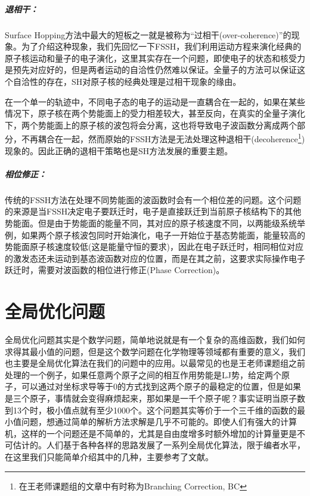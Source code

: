 \documentclass[12pt,a4paper,openany,twoside]{book}
\numberwithin{equation}{section}
\begin{document}
        \paragraph{退相干：}Surface Hopping方法中最大的短板之一就是被称为“过相干(over-coherence)”的现象。为了介绍这种现象，我们先回忆一下FSSH，我们利用运动方程来演化经典的原子核运动和量子的电子演化，这里其实存在一个问题，即使电子的状态和核受力是预先对应好的，但是两者运动的自洽性仍然难以保证。全量子的方法可以保证这个自洽性的存在，SH对原子核的经典处理是过相干现象的缘由。

        在一个单一的轨迹中，不同电子态的电子的运动是一直耦合在一起的，如果在某些情况下，原子核在两个势能面上的受力相差较大，甚至反向，在真实的全量子演化下，两个势能面上的原子核的波包将会分离，这也将导致电子波函数分离成两个部分，不再耦合在一起，然而原始的FSSH方法是无法处理这种退相干(decoherence\footnote{在王老师课题组的文章中有时称为Branching Correction, BC})现象的。因此正确的退相干策略也是SH方法发展的重要主题。
        
        \paragraph{相位修正：}传统的FSSH方法在处理不同势能面的波函数时会有一个相位差的问题。这个问题的来源是当FSSH决定电子要跃迁时，电子是直接跃迁到当前原子核结构下的其他势能面。但是由于势能面的能量不同，其对应的原子核速度不同，以两能级系统举例，如果两个原子核波包同时开始演化，电子一开始位于基态势能面，能量较高的势能面原子核速度较低(这是能量守恒的要求)，因此在电子跃迁时，相同相位对应的激发态还未运动到基态波函数对应的位置，而是在其之前，这要求实际操作电子跃迁时，需要对波函数的相位进行修正(Phase Correction)。

    \chapter{全局优化问题}
      全局优化问题其实是个数学问题，简单地说就是有一个复杂的高维函数，我们如何求得其最小值的问题，但是这个数学问题在化学物理等领域都有重要的意义，我们也主要是全局优化算法在我们的问题中的应用。以最常见的也是王老师课题组之前处理的一个例子，如果任意两个原子之间的相互作用势能是LJ势，给定两个原子，可以通过对坐标求导等于0的方式找到这两个原子的最稳定的位置，但是如果是三个原子，事情就会变得麻烦起来，那如果是一千个原子呢？事实证明当原子数到13个时，极小值点就有至少1000个。这个问题其实等价于一个三千维的函数的最小值问题，想通过简单的解析方法求解是几乎不可能的。即使人们有强大的计算机，这样的一个问题还是不简单的，尤其是自由度增多时额外增加的计算量更是不可估计的。人们基于各种各样的思路发展了一系列全局优化算法，限于编者水平，在这里我们只能简单介绍其中的几种，主要参考了文献\cite{Kaplan2006}\cite{卡普兰2013分子间相互作用}。
\end{document}
